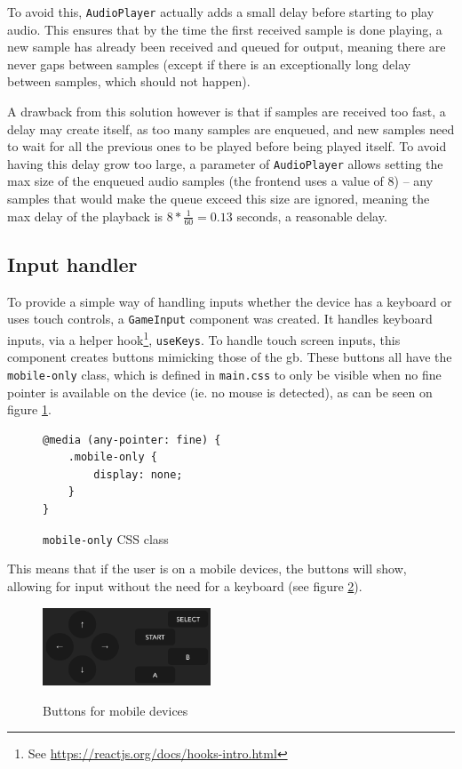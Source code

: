 \documentclass[11pt]{informatics-report}
\newcommand{\ftnt}[1]{\footnote{See \url{#1}}}
\begin{document}
To avoid this, \texttt{AudioPlayer} actually adds a small delay before starting to play audio. This ensures that by the time the first received sample is done playing, a new sample has already been received and queued for output, meaning there are never gaps between samples (except if there is an exceptionally long delay between samples, which should not happen).

A drawback from this solution however is that if samples are received too fast, a delay may create itself, as too many samples are enqueued, and new samples need to wait for all the previous ones to be played before being played itself. To avoid having this delay grow too large, a parameter of \texttt{AudioPlayer} allows setting the max size of the enqueued audio samples (the frontend uses a value of 8) -- any samples that would make the queue exceed this size are ignored, meaning the max delay of the playback is $8*\frac{1}{60}=0.13$ seconds, a reasonable delay.

\subsection{Input handler}

To provide a simple way of handling inputs whether the device has a keyboard or uses touch controls, a \texttt{GameInput} component was created. It handles keyboard inputs, via a helper hook\ftnt{https://reactjs.org/docs/hooks-intro.html}, \texttt{useKeys}. To handle touch screen inputs, this component creates buttons mimicking those of the \gls{gb}. These buttons all have the \texttt{mobile-only} class, which is defined in \texttt{main.css} to only be visible when no fine pointer is available on the device (ie. no mouse is detected), as can be seen on figure \ref{fig:css-mobile-only}.

\begin{figure}[h]
    \begin{verbatim}
@media (any-pointer: fine) {
    .mobile-only {
        display: none;
    }
}
    \end{verbatim}
    \caption{\texttt{mobile-only} CSS class}
    \label{fig:css-mobile-only}
\end{figure}

This means that if the user is on a mobile devices, the buttons will show, allowing for input without the need for a keyboard (see figure \ref{fig:ui-mobile-buttons}).

\begin{figure}[h]
    \centering
    \includegraphics[width=5cm]{images/ui-mobile-buttons}\\
    \caption{Buttons for mobile devices}
    \label{fig:ui-mobile-buttons}
\end{figure}
\end{document}
